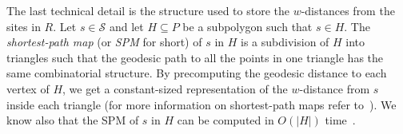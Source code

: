 \documentclass[a4paper,UKenglish]{socg-lipics-v2018}
\newcommand{\s}{\mathcal S}
\newcommand{\funnel}[2][P]{\ensuremath{\mathtt{Funnel}_{\scriptscriptstyle #1}(#2)}}
\newcommand{\cell}[2][P]{\ensuremath{\mathtt{Cell}_{\scriptscriptstyle #1}(#2)}}
\newcommand{\bcell}[2][P]{\ensuremath{\mathtt{bCell}_{\scriptscriptstyle #1}(#2)}}
\newcommand{\red}{\color{red}}
\newcommand{\marrow}{\marginpar[\hfill$\longrightarrow$]{$\longleftarrow$}}
\newcommand{\luis}[1]{{\red \textsc{Luis:} \marrow\textsf{#1}}}
\begin{document}
%
%

The last technical detail is the structure used to store the $w$-distances from the sites in $R$.
Let $s\in \s$ and let $H\subseteq P$ be a subpolygon such that $s\in H$.
The \emph{shortest-path map} (or \emph{SPM} for short) of $s$ in $H$ is a subdivision of $H$ into triangles such that the geodesic path to all the points in one triangle has the same combinatorial structure. 
By precomputing the geodesic distance to each vertex of $H$, we get a constant-sized representation of the $w$-distance from $s$ inside each triangle (for more information on shortest-path maps refer to~\cite{guibasShortestPathTree}). We know also that the SPM of $s$ in $H$ can be computed in $O(|H|)$ time~\cite{chazelle1991triangulating,guibasShortestPathTree}. 
\end{document}
